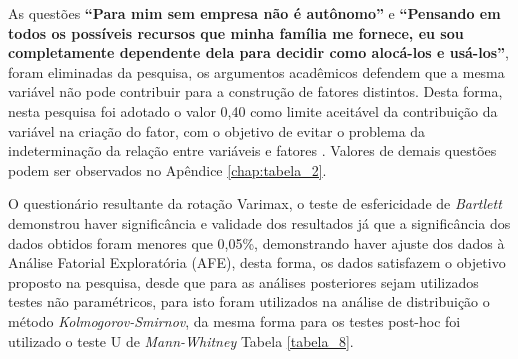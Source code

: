 As questões \textbf{“Para mim sem empresa não é autônomo”} e \textbf{“Pensando em todos os possíveis recursos que minha família me fornece, eu sou completamente dependente dela para decidir como alocá-los e usá-los”}, foram eliminadas da pesquisa, os argumentos acadêmicos defendem que a mesma variável não pode contribuir para a construção de fatores distintos. Desta forma, nesta pesquisa foi adotado o valor 0,40 como limite aceitável da contribuição da variável na criação do fator, com o objetivo de evitar o problema da indeterminação da relação entre variáveis e fatores \cite{figueiredo_filho_visao_2010}. Valores de demais questões podem ser observados no  Apêndice \ref{chap:tabela_2}. 







O questionário resultante da rotação Varimax, o teste de esfericidade de \textit{Bartlett} demonstrou haver significância e validade dos resultados já que a significância dos dados obtidos foram menores que 0,05\%, demonstrando haver ajuste dos dados à Análise Fatorial Exploratória (AFE), desta forma, os dados satisfazem o objetivo proposto na pesquisa, desde que para as análises posteriores sejam utilizados testes não paramétricos, para isto foram utilizados na análise de distribuição o método \textit{Kolmogorov-Smirnov}, da mesma forma para os testes post-hoc foi utilizado o teste U de \textit{Mann-Whitney} Tabela \ref{tabela_8}.

